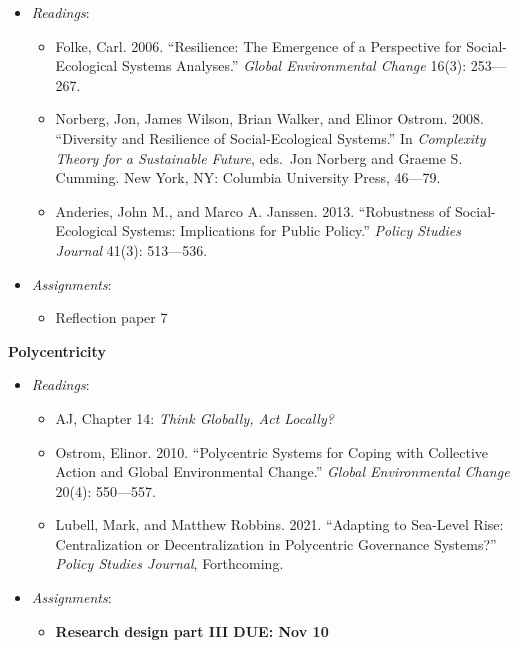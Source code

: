 \begin{itemize}

\item
  \emph{Readings}:

  \begin{itemize}
  
  \item
    Folke, Carl. 2006. ``Resilience: The Emergence of a Perspective for
    Social-Ecological Systems Analyses.'' \emph{Global Environmental
    Change} 16(3): 253---267.
  \item
    Norberg, Jon, James Wilson, Brian Walker, and Elinor Ostrom. 2008.
    ``Diversity and Resilience of Social-Ecological Systems.'' In
    \emph{Complexity Theory for a Sustainable Future}, eds.~Jon Norberg
    and Graeme S. Cumming. New York, NY: Columbia University Press,
    46---79.
  \item
    Anderies, John M., and Marco A. Janssen. 2013. ``Robustness of
    Social-Ecological Systems: Implications for Public Policy.''
    \emph{Policy Studies Journal} 41(3): 513---536.
  \end{itemize}
\item
  \emph{Assignments}:

  \begin{itemize}
  
  \item
    Reflection paper 7
  \end{itemize}
\end{itemize}

\week \textbf{Polycentricity}

\begin{itemize}

\item
  \emph{Readings}:

  \begin{itemize}
  
  \item
    AJ, Chapter 14: \emph{Think Globally, Act Locally?}
  \item
    Ostrom, Elinor. 2010. ``Polycentric Systems for Coping with
    Collective Action and Global Environmental Change.'' \emph{Global
    Environmental Change} 20(4): 550---557.
  \item
    Lubell, Mark, and Matthew Robbins. 2021. ``Adapting to Sea-Level
    Rise: Centralization or Decentralization in Polycentric Governance
    Systems?'' \emph{Policy Studies Journal}, Forthcoming.
  \end{itemize}
\item
  \emph{Assignments}:

  \begin{itemize}
  
  \item
    \textbf{Research design part III DUE: Nov 10}
  \end{itemize}
\end{itemize}

